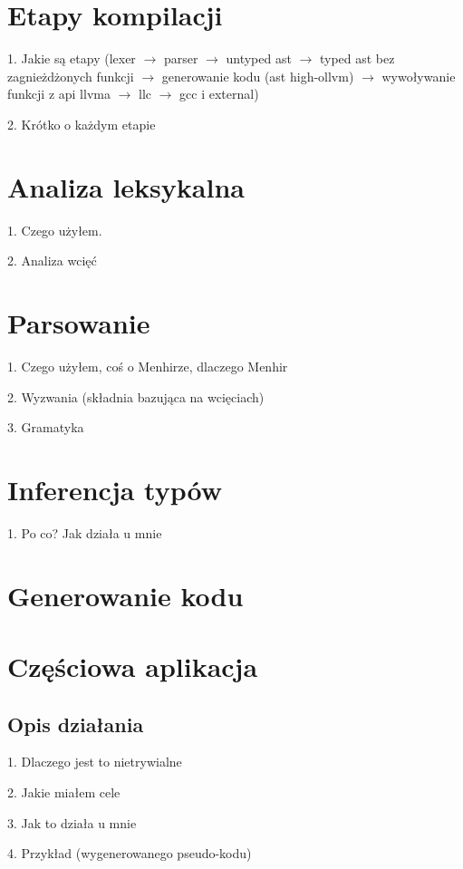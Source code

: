 \documentclass[declaration,shortabstract]{iithesis}
\begin{document}
\section{Etapy kompilacji}

1. Jakie są etapy (lexer $\rightarrow$ parser $\rightarrow$ untyped ast $\rightarrow$ 
typed ast bez zagnieżdżonych funkcji $\rightarrow$ generowanie kodu (ast high-ollvm)
$\rightarrow$ wywoływanie funkcji z api llvma $\rightarrow$ llc $\rightarrow$ gcc i external) 

2. Krótko o każdym etapie

\section{Analiza leksykalna}

1. Czego użyłem. 

2. Analiza wcięć 

\section{Parsowanie}

1. Czego użyłem, coś o Menhirze, dlaczego Menhir 

2. Wyzwania (składnia bazująca na wcięciach)

3. Gramatyka

\section{Inferencja typów}

1. Po co? Jak działa u mnie

\section{Generowanie kodu}
\section{Częściowa aplikacja}

\subsection{Opis działania}

1. Dlaczego jest to nietrywialne

2. Jakie miałem cele 

3. Jak to działa u mnie 

4. Przykład (wygenerowanego pseudo-kodu)
\end{document}
